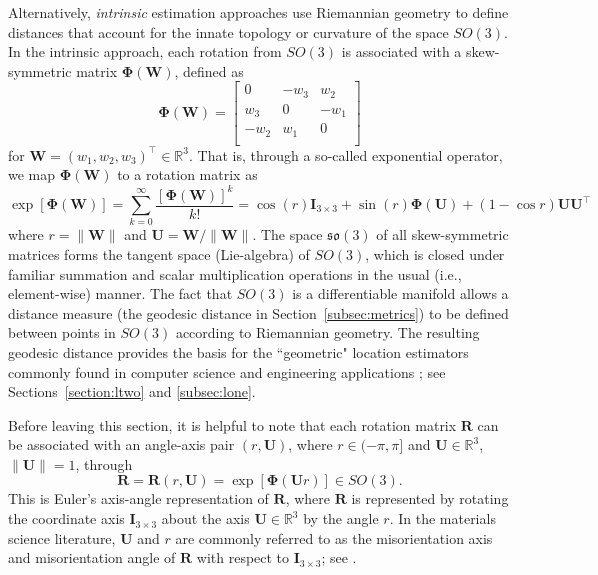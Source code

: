 \noindent Alternatively, \textit{intrinsic} estimation approaches use Riemannian geometry to define distances that account for the innate topology or curvature of the space $SO(3)$.  In the intrinsic approach, each rotation from $SO(3)$ is
associated with a skew-symmetric matrix $\bm{\Phi}(\bm{W})$, defined  as
\[
  \bm{\Phi}(\bm{W}) = \left[ \begin{array}{ccc} 0 & -w_3 & w_2\\
  w_3 & 0 & -w_1\\
 - w_2 & w_1 & 0\\
  \end{array}
 \right]
\]
for $\bm{W}=(w_1, w_2, w_3)^\top \in \mathbb{R}^3$. That is, through a so-called exponential operator,
we map  $\bm{\Phi}(\bm{W})$ to a rotation matrix as
\[
  \exp[\bm{\Phi}(\bm{W})] = \sum\limits_{k=0}^\infty \frac{[\bm{\Phi}(\bm{W})]^k}{k!}=\cos(r)\bm{I}_{3\times3} + \sin(r) \bm{\Phi}(\bm{U}) + (1-\cos r) \bm{U} \bm{U}^\top
\]
where $r=\|\bm{W}\|$ and $\bm{U} =\bm{W}/\|\bm{W}\| $.  The space $\mathfrak{so}(3)$ of all skew-symmetric matrices forms the tangent space (Lie-algebra) of $SO(3)$, which is closed under familiar summation and scalar multiplication operations in the usual (i.e., element-wise) manner. The fact that $SO(3)$ is a differentiable manifold allows a distance measure (the geodesic distance in Section~\ref{subsec:metrics}) to be defined between points in $SO(3)$ according to Riemannian geometry. The resulting geodesic distance provides the basis for the ``geometric" location estimators commonly found in computer science \citep{fletcher08, fletcher09, hartley11} and engineering applications \citep{manton04}; see Sections~\ref{section:ltwo} and \ref{subsec:lone}.

\noindent Before leaving this section, it is helpful to note that each rotation matrix $\bm{R}$ can be associated with an angle-axis 
pair $(r,\bm{U})$, where $r\in(-\pi,\pi]$ and $\bm{U}\in\mathbb{R}^3$, $\|\bm{U}\|=1$, through
\begin{equation}
\label{eqn:angleaxis}
 \bm{R} = \bm{R}(r,\bm{U}) = \exp[\bm\Phi(\bm{U} r)] \in SO(3).
\end{equation}
This is Euler's axis-angle representation of $\bm{R}$, where $\bm{R}$ is represented by rotating the coordinate axis $\bm{I}_{3 \times 3}$ about the axis $\bm{U}\in\mathbb{R}^3$ by the angle $r$. In the materials science literature,
$\bm{U}$ and $r$ are commonly referred to as the misorientation axis and misorientation angle of $\bm R$ with respect to  $\bm{I}_{3 \times 3}$; see \cite{randle03}.


